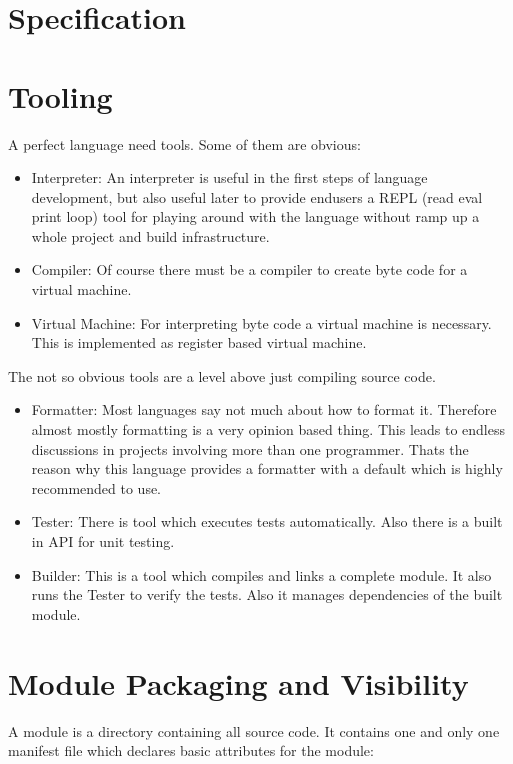 \documentclass[a4paper,12pt]{report}
\begin{document}
\section{Specification}

\section{Tooling}

A perfect language need tools. Some of them are obvious:

\begin{itemize}
    \item Interpreter: An interpreter is useful in the first steps of language development, but also useful later to provide endusers a REPL (read eval print loop) tool for playing around with the language without ramp up a whole project and build infrastructure.
    \item Compiler: Of course there must be a compiler to create byte code for a virtual machine.
    \item Virtual Machine: For interpreting byte code a virtual machine is necessary. This is implemented as register based virtual machine.
\end{itemize}

The not so obvious tools are a level above just compiling source code.

\begin{itemize}
    \item Formatter: Most languages say not much about how to format it. Therefore almost mostly formatting is a very opinion based thing. This leads to endless discussions in projects involving more than one programmer. Thats the reason why this language provides a formatter with a default which is highly recommended to use.
    \item Tester: There is tool which executes tests automatically. Also there is a built in API for unit testing.
    \item Builder: This is a tool which compiles and links a complete module. It also runs the Tester to verify the tests. Also it manages dependencies of the built module.
\end{itemize}

\section{Module Packaging and Visibility}

A module is a directory containing all source code. It contains one and only one manifest file which declares basic attributes for the module:
\end{document}
